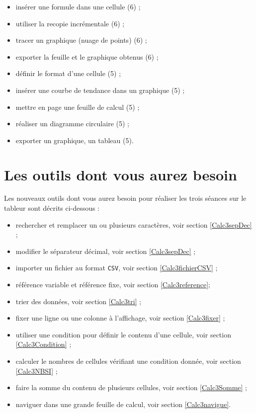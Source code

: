 \begin{itemize}
\item insérer une formule dans une cellule (6) ;
\item utiliser la recopie incrémentale (6) ;
\item tracer un graphique (nuage de points) (6) ;
\item exporter la feuille et le graphique obtenus (6) ;
\item définir le format d'une cellule (5) ;
\item insérer une courbe de tendance dans un graphique (5) ;
\item mettre en page une feuille de calcul (5) ;
\item réaliser un diagramme circulaire (5) ;
\item exporter un graphique, un tableau (5).
\end{itemize}


\section{Les outils dont vous aurez besoin}\label{Tableur4eOutils}
 
Les nouveaux outils dont vous aurez besoin pour réaliser les trois séances sur le tableur sont décrits ci-dessous :

\begin{itemize}
\item rechercher et remplacer un ou plusieurs caractères, voir section \vref{Calc3sepDec} ;
\item modifier le séparateur décimal, voir section \vref{Calc3sepDec} ;  
\item importer un fichier au format \texttt{CSV}, voir section \vref{Calc3fichierCSV} ;
\item référence variable et référence fixe, voir section \vref{Calc3reference};
\item trier des données, voir section \vref{Calc3tri} ;
\item fixer une ligne ou une colonne à l'affichage, voir section \vref{Calc3fixer} ;
\item utiliser une condition pour définir le contenu d'une cellule, voir section \vref{Calc3Condition} ;
\item calculer le nombres de cellules vérifiant une condition donnée, voir section \vref{Calc3NBSI} ;
\item faire la somme du contenu de plusieurs cellules, voir section \vref{Calc3Somme} ;
\item naviguer dans une grande feuille de calcul, voir section \vref{Calc3navigue}.
\end{itemize}  




